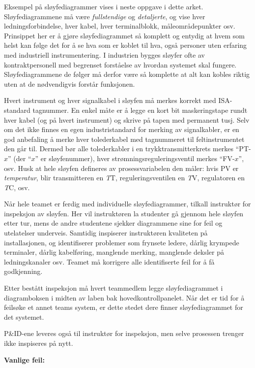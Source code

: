 Eksempel på sløyfediagrammer vises i neste oppgave i dette arket. Sløyfediagrammene må være {\it fullstendige} og {\it detaljerte}, og vise hver ledningsforbindelse, hver kabel, hver terminalblokk, måleområdepunkter osv. Prinsippet her er å gjøre sløyfediagrammet så komplett og entydig at hvem som helst kan følge det for å se hva som er koblet til hva, også personer uten erfaring med industriell instrumentering. I industrien bygges sløyfer ofte av kontraktpersonell med begrenset forståelse av hvordan systemet skal fungere. Sløyfediagrammene de følger må derfor være så komplette at alt kan kobles riktig uten at de nødvendigvis forstår funksjonen.

Hvert instrument og hver signalkabel i sløyfen må merkes korrekt med ISA-standard tagnummer. En enkel måte er å legge en kort bit maskeringstape rundt hver kabel (og på hvert instrument) og skrive på tapen med permanent tusj. Selv om det ikke finnes en egen industristandard for merking av signalkabler, er en god anbefaling å merke hver tolederkabel med tagnummeret til feltinstrumentet den går til. Dermed bør alle tolederkabler i en trykktransmitterkrets merkes ``PT-$x$'' (der ``$x$'' er sløyfenummer), hver strømningsreguleringsventil merkes ``FV-$x$'', osv. Husk at hele sløyfen defineres av prosessvariabelen den måler: hvis PV er {\it temperatur}, blir transmitteren en {\it T}T, reguleringsventilen en {\it T}V, regulatoren en {\it T}C, osv.

Når hele teamet er ferdig med individuelle sløyfediagrammer, tilkall instruktør for inspeksjon av sløyfen. Her vil instruktøren la studenter gå gjennom hele sløyfen etter tur, mens de andre studentene sjekker diagrammene sine for feil og utelatelser underveis. Samtidig inspiserer instruktøren kvaliteten på installasjonen, og identifiserer problemer som frynsete ledere, dårlig krympede terminaler, dårlig kabelføring, manglende merking, manglende deksler på ledningskanaler osv. Teamet må korrigere alle identifiserte feil for å få godkjenning.

Etter bestått inspeksjon må hvert teammedlem legge sløyfediagrammet i diagramboksen i midten av laben bak hovedkontrollpanelet. Når det er tid for å feilsøke et annet teams system, er dette stedet dere finner sløyfediagrammet for det systemet.

P\&ID-ene leveres også til instruktør for inspeksjon, men selve prosessen trenger ikke inspiseres på nytt.

\vskip 10pt

{\bf Vanlige feil:}

